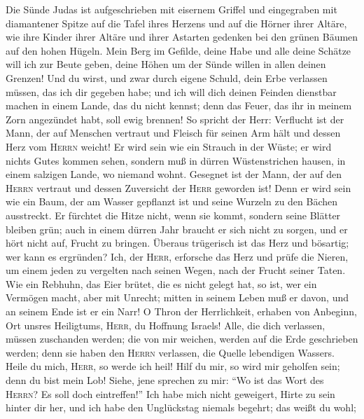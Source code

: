  Die Sünde Judas ist aufgeschrieben mit eisernem Griffel
und eingegraben mit diamantener Spitze auf die Tafel ihres Herzens und
auf die Hörner ihrer Altäre,  wie ihre Kinder ihrer Altäre
und ihrer Astarten gedenken bei den grünen Bäumen auf den hohen Hügeln.
 Mein Berg im Gefilde, deine Habe und alle deine Schätze
will ich zur Beute geben, deine Höhen um der Sünde willen in allen
deinen Grenzen!  Und du wirst, und zwar durch eigene
Schuld, dein Erbe verlassen müssen, das ich dir gegeben habe; und ich
will dich deinen Feinden dienstbar machen in einem Lande, das du nicht
kennst; denn das Feuer, das ihr in meinem Zorn angezündet habt, soll
ewig brennen!  So spricht der Herr: Verflucht ist der
Mann, der auf Menschen vertraut und Fleisch für seinen Arm hält und
dessen Herz vom \textsc{Herrn} weicht!  Er wird sein wie
ein Strauch in der Wüste; er wird nichts Gutes kommen sehen, sondern muß
in dürren Wüstenstrichen hausen, in einem salzigen Lande, wo niemand
wohnt.  Gesegnet ist der Mann, der auf den \textsc{Herrn}
vertraut und dessen Zuversicht der \textsc{Herr} geworden ist!
 Denn er wird sein wie ein Baum, der am Wasser gepflanzt
ist und seine Wurzeln zu den Bächen ausstreckt. Er fürchtet die Hitze
nicht, wenn sie kommt, sondern seine Blätter bleiben grün; auch in einem
dürren Jahr braucht er sich nicht zu sorgen, und er hört nicht auf,
Frucht zu bringen.  Überaus trügerisch ist das Herz und
bösartig; wer kann es ergründen?  Ich, der \textsc{Herr},
erforsche das Herz und prüfe die Nieren, um einem jeden zu vergelten
nach seinen Wegen, nach der Frucht seiner Taten.  Wie ein
Rebhuhn, das Eier brütet, die es nicht gelegt hat, so ist, wer ein
Vermögen macht, aber mit Unrecht; mitten in seinem Leben muß er davon,
und an seinem Ende ist er ein Narr!  O Thron der
Herrlichkeit, erhaben von Anbeginn, Ort unsres Heiligtums,
\textsc{Herr}, du Hoffnung Israels!  Alle, die dich
verlassen, müssen zuschanden werden; die von mir weichen, werden auf die
Erde geschrieben werden; denn sie haben den \textsc{Herrn} verlassen,
die Quelle lebendigen Wassers.  Heile du mich,
\textsc{Herr}, so werde ich heil! Hilf du mir, so wird mir geholfen
sein; denn du bist mein Lob!  Siehe, jene sprechen zu
mir: ``Wo ist das Wort des \textsc{Herrn}? Es soll doch eintreffen!''
 Ich habe mich nicht geweigert, Hirte zu sein hinter dir
her, und ich habe den Unglückstag niemals begehrt; das weißt du wohl;
